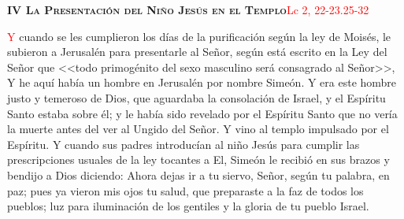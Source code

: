 \noindent\textbf{\textsc{IV La Presentación del Niño Jesús en el Templo}}\hfill\textcolor{red}{Lc 2, 22-23.25-32}

\vspace{0.25em}

\lettrine[lines=2]{\textcolor{red}{Y}}\space{} cuando se les cumplieron los días de la purificación según la ley de Moisés, le subieron a Jerusalén para presentarle al Señor,
según está escrito en la Ley del Señor que <<todo primogénito del sexo masculino será consagrado al Señor>>,  Y he aquí había un hombre en Jerusalén por nombre Simeón. Y era
este hombre justo y temeroso de Dios, que aguardaba la consolación de Israel, y el Espíritu Santo estaba sobre él; y le había sido revelado por el Espíritu Santo que no vería
la muerte antes del ver al Ungido del Señor. Y vino al templo impulsado por el Espíritu. Y cuando sus padres introducían al niño Jesús para cumplir las prescripciones usuales
de la ley tocantes a El, Simeón le recibió en sus brazos y bendijo a Dios diciendo: Ahora dejas ir a tu siervo, Señor, según tu palabra, en paz; pues ya vieron mis ojos tu salud,
que preparaste a la faz de todos los pueblos; luz para iluminación de los gentiles y la gloria de tu pueblo Israel.
